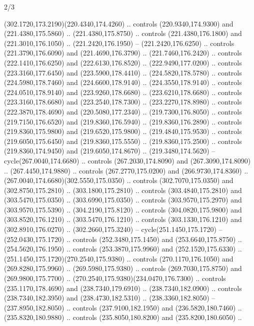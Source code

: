 \begin{flagdescription}{2/3}
\begin{scope}[xshift=0.5\flaglength,yshift=0.5\flagwidth,scale=\flagwidth/259.2]
\begin{scope}[y=0.8pt, x=0.8pt, yscale=-1,shift={(-243,-162)}]
      (302.1720,173.2190)(220.4340,174.4260) .. controls (220.9340,174.9300) and
      (221.4380,175.5860) .. (221.4380,175.8750) .. controls (221.4380,176.1800) and
      (221.3010,176.1050) .. (221.2420,176.1950) -- (221.2420,176.6250) .. controls
      (221.3790,176.6090) and (221.4690,176.3790) .. (221.7460,176.2420) .. controls
      (222.1410,176.6250) and (222.6130,176.8520) .. (222.9490,177.0200) .. controls
      (223.3160,177.6450) and (223.5900,178.4410) .. (224.5820,178.5780) .. controls
      (224.5980,178.7460) and (224.6600,178.9140) .. (224.3550,178.9140) .. controls
      (224.0510,178.9140) and (223.9260,178.6680) .. (223.6210,178.6680) .. controls
      (223.3160,178.6680) and (223.2540,178.7300) .. (223.2270,178.8980) .. controls
      (222.3870,178.4690) and (220.5080,177.2340) .. (219.7300,176.8050) .. controls
      (219.7150,176.6520) and (219.8360,176.5940) .. (219.8360,176.2890) .. controls
      (219.8360,175.9800) and (219.6520,175.9800) .. (219.4840,175.9530) .. controls
      (219.6050,175.6450) and (219.8360,175.5550) .. (219.8360,175.2500) .. controls
      (219.8360,174.9450) and (219.6050,174.8670) .. (219.3480,174.5620) --
      cycle(267.0040,174.6680) .. controls (267.2030,174.8090) and
      (267.3090,174.8090) .. (267.4450,174.9880) .. controls (267.2770,175.0200) and
      (266.9730,174.8360) .. (267.0040,174.6680)(302.5550,175.0350) .. controls
      (302.7070,175.0350) and (302.8750,175.2810) .. (303.1800,175.2810) .. controls
      (303.4840,175.2810) and (303.5470,175.0350) .. (303.6990,175.0350) .. controls
      (303.9570,175.2970) and (303.9570,175.5390) .. (304.2190,175.8120) .. controls
      (304.0820,175.9800) and (303.8520,176.1210) .. (303.5470,176.1210) .. controls
      (303.1330,176.1210) and (302.8910,176.0270) .. (302.2660,175.3240) --
      cycle(251.1450,175.1720) -- (252.0430,175.1720) .. controls
      (252.3480,175.1450) and (253.6640,175.8750) .. (254.5620,176.1950) .. controls
      (253.3870,175.9960) and (252.1520,175.6330) ..
      (251.1450,175.1720)(270.2540,175.9380) .. controls (270.1170,176.1050) and
      (269.8280,175.9960) .. (269.5980,175.9380) .. controls (269.7030,175.8750) and
      (269.9800,175.7700) .. (270.2540,175.9380)(234.0470,176.7300) .. controls
      (235.1170,178.4690) and (238.7340,179.6910) .. (238.7340,182.0900) .. controls
      (238.7340,182.3950) and (238.4730,182.5310) .. (238.3360,182.8050) --
      (237.8950,182.8050) .. controls (237.9100,182.1950) and (236.5820,180.7460) ..
      (235.8320,180.9880) .. controls (235.8050,180.8200) and (235.8200,180.6050) ..

\end{scope}
\end{scope}
\end{flagdescription}
